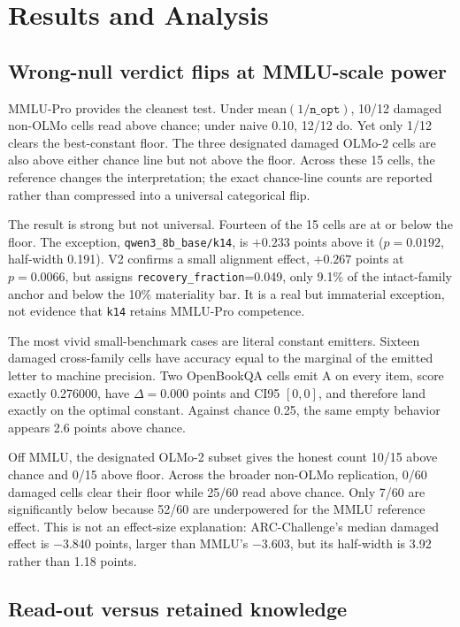 \section{Results and Analysis}

\subsection{Wrong-null verdict flips at MMLU-scale power}

MMLU-Pro provides the cleanest test. Under $\mathrm{mean}(1/\texttt{n\_opt})$, 10/12 damaged non-OLMo cells read above chance; under naive 0.10, 12/12 do. Yet only 1/12 clears the best-constant floor. The three designated damaged OLMo-2 cells are also above either chance line but not above the floor. Across these 15 cells, the reference changes the interpretation; the exact chance-line counts are reported rather than compressed into a universal categorical flip.

The result is strong but not universal. Fourteen of the 15 cells are at or below the floor. The exception, \texttt{qwen3\_8b\_base/k14}, is $+0.233$ points above it ($p=0.0192$, half-width 0.191). V2 confirms a small alignment effect, $+0.267$ points at $p=0.0066$, but assigns \texttt{recovery\_fraction}=0.049, only 9.1\% of the intact-family anchor and below the 10\% materiality bar. It is a real but immaterial exception, not evidence that \texttt{k14} retains MMLU-Pro competence.

The most vivid small-benchmark cases are literal constant emitters. Sixteen damaged cross-family cells have accuracy equal to the marginal of the emitted letter to machine precision. Two OpenBookQA cells emit A on every item, score exactly 0.276000, have $\Delta=0.000$ points and CI95 $[0,0]$, and therefore land exactly on the optimal constant. Against chance 0.25, the same empty behavior appears 2.6 points above chance.

Off MMLU, the designated OLMo-2 subset gives the honest count 10/15 above chance and 0/15 above floor. Across the broader non-OLMo replication, 0/60 damaged cells clear their floor while 25/60 read above chance. Only 7/60 are significantly below because 52/60 are underpowered for the MMLU reference effect. This is not an effect-size explanation: ARC-Challenge's median damaged effect is $-3.840$ points, larger than MMLU's $-3.603$, but its half-width is 3.92 rather than 1.18 points.



\subsection{Read-out versus retained knowledge}

